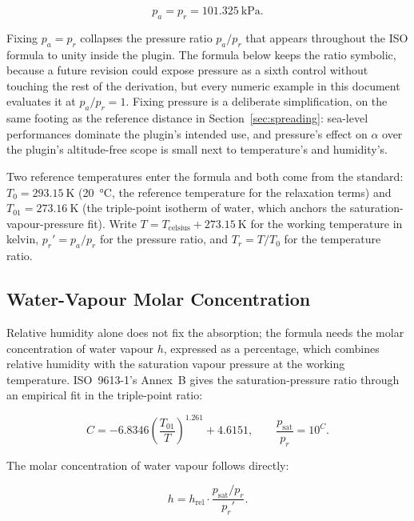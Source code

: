 \documentclass[11pt,a4paper]{article}
\begin{document}
\begin{equation}
p_a = p_r = \SI{101.325}{\kilo\pascal} .
\end{equation}

Fixing $p_a = p_r$ collapses the pressure ratio $p_a/p_r$ that appears throughout the ISO formula to unity inside the plugin.
The formula below keeps the ratio symbolic, because a future revision could expose pressure as a sixth control without touching the rest of the derivation, but every numeric example in this document evaluates it at $p_a/p_r = 1$.
Fixing pressure is a deliberate simplification, on the same footing as the reference distance in Section~\ref{sec:spreading}: sea-level performances dominate the plugin's intended use, and pressure's effect on $\alpha$ over the plugin's altitude-free scope is small next to temperature's and humidity's.

Two reference temperatures enter the formula and both come from the standard: $T_0 = \SI{293.15}{\kelvin}$ (\SI{20}{\celsius}, the reference temperature for the relaxation terms) and $T_{01} = \SI{273.16}{\kelvin}$ (the triple-point isotherm of water, which anchors the saturation-vapour-pressure fit).
Write $T = T_\text{celsius} + \SI{273.15}{\kelvin}$ for the working temperature in kelvin, $p_r' = p_a/p_r$ for the pressure ratio, and $T_r = T/T_0$ for the temperature ratio.

\subsection{Water-Vapour Molar Concentration}

Relative humidity alone does not fix the absorption; the formula needs the molar concentration of water vapour $h$, expressed as a percentage, which combines relative humidity with the saturation vapour pressure at the working temperature.
ISO~9613-1's Annex~B gives the saturation-pressure ratio through an empirical fit in the triple-point ratio:

\begin{equation}
C = -6.8346 \left(\frac{T_{01}}{T}\right)^{1.261} + 4.6151 ,
\qquad
\frac{p_\text{sat}}{p_r} = 10^{C} .
\end{equation}

The molar concentration of water vapour follows directly:

\begin{equation}
h = h_\text{rel} \cdot \frac{p_\text{sat}/p_r}{p_r'} .
\end{equation}
\end{document}
